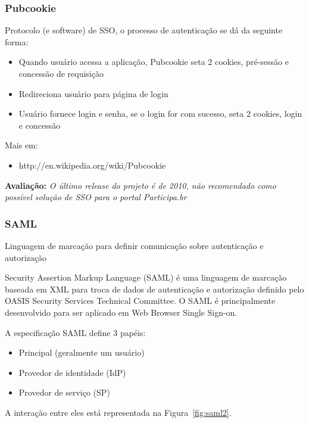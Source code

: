 \documentclass[11pt]{article}
\begin{document}
\subsubsection{Pubcookie}

Protocolo (e software) de SSO, o processo de autenticação se dá da seguinte
forma:

\begin{itemize}
  \item{Quando usuário acessa a aplicação, Pubcookie seta 2 cookies, pré-sessão e concessão de requisição}
  \item{Redireciona usuário para página de login}
  \item{Usuário fornece login e senha, se o login for com sucesso, seta 2 cookies, login e concessão}
\end{itemize}

Mais em:
\begin{itemize}
  \item{http://en.wikipedia.org/wiki/Pubcookie}
\end{itemize}

{\bf Avaliação:} {\it O último release do projeto é de 2010, não recomendado
como possível solução de SSO para o portal Participa.br}

\subsubsection{SAML}

Linguagem de marcação para definir comunicação sobre autenticação e autorização

Security Assertion Markup Language (SAML) é uma linguagem de marcação baseada
em XML para troca de dados de autenticação e autorização definido pelo OASIS
Security Services Technical Committee. O SAML é principalmente desenvolvido
para ser aplicado em Web Browser Single Sign-on.

A especificação SAML define 3 papéis:
\begin{itemize}
  \item{Principal (geralmente um usuário)}
  \item{Provedor de identidade (IdP)}
  \item{Provedor de serviço (SP)}
\end{itemize}

A interação entre eles está representada na Figura~\ref{fig:saml2}.
\end{document}
